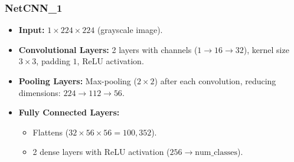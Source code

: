 \documentclass[12pt]{article}
\begin{document}
\subsubsection*{NetCNN\_1}

\begin{itemize}
    \item \textbf{Input:} \(1 \times 224 \times 224\) (grayscale image).
    \item \textbf{Convolutional Layers:} 2 layers with channels (\(1 \to 16 \to 32\)), kernel size \(3 \times 3\), padding \(1\), ReLU activation.
    \item \textbf{Pooling Layers:} Max-pooling (\(2 \times 2\)) after each convolution, reducing dimensions: \(224 \to 112 \to 56\).
    \item \textbf{Fully Connected Layers:} 
    \begin{itemize}
        \item Flattens (\(32 \times 56 \times 56 = 100,352\)).
        \item 2 dense layers with ReLU activation (\(256 \to \text{num\_classes}\)).
    \end{itemize}
\end{itemize}

\end{document}

